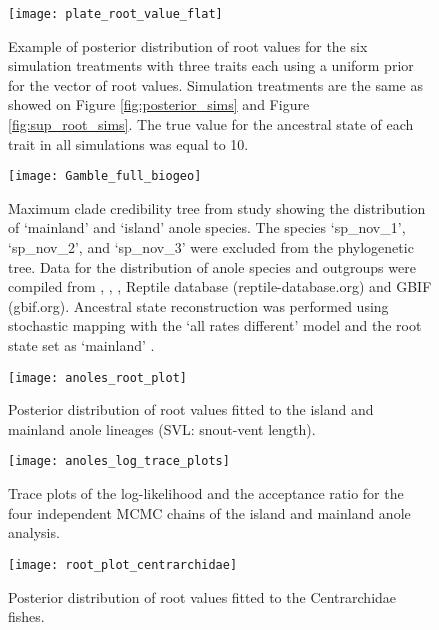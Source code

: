 \pagebreak

\begin{figure}[h]
	\centering
	\texttt{[image: plate\_root\_value\_flat]}
	\caption{Example of posterior distribution of root values for the six simulation treatments with three traits each using a uniform prior for the vector of root values. Simulation treatments are the same as showed on Figure \ref{fig:posterior_sims} and Figure \ref{fig:sup_root_sims}. The true value for the ancestral state of each trait in all simulations was equal to 10.}
	\label{fig:sup_root_sims_flat}
\end{figure}

\pagebreak

\begin{figure}[h]
	\centering
	\texttt{[image: Gamble\_full\_biogeo]}
	\caption{Maximum clade credibility tree from \citet{gamble_anolis_2014} study showing the distribution of `mainland' and `island' anole species. The species `sp\_nov\_1', `sp\_nov\_2', and `sp\_nov\_3'  were excluded from the phylogenetic tree. Data for the distribution of anole species and outgroups were compiled from \citet{nicholson_mainland_2005}, \citet{losos_lizards_2009}, \citet{thomas_body_2009}, Reptile database (reptile-database.org) and GBIF (gbif.org). Ancestral state reconstruction was performed using stochastic mapping with the `all rates different' model and the root state set as `mainland' \citep{nicholson_mainland_2005, losos_lizards_2009}. }
	\label{fig:biogeo_gamble}
\end{figure}

\pagebreak

\begin{figure}[h]
	\centering
	\texttt{[image: anoles\_root\_plot]}
	\caption{Posterior distribution of root values fitted to the island and mainland anole lineages (SVL: snout-vent length).}
	\label{fig:sup_root_anoles}
\end{figure}

\pagebreak

\begin{figure}[h]
	\centering
	\texttt{[image: anoles\_log\_trace\_plots]}
	\caption{Trace plots of the log-likelihood and the acceptance ratio for the four independent MCMC chains of the island and mainland anole analysis. }
	\label{fig:sup_trace_anoles}
\end{figure}

\pagebreak

\begin{figure}[h]
	\centering
	\texttt{[image: root\_plot\_centrarchidae]}
	\caption{Posterior distribution of root values fitted to the Centrarchidae fishes.}
	\label{fig:sup_root_centrarchidae}
\end{figure}

